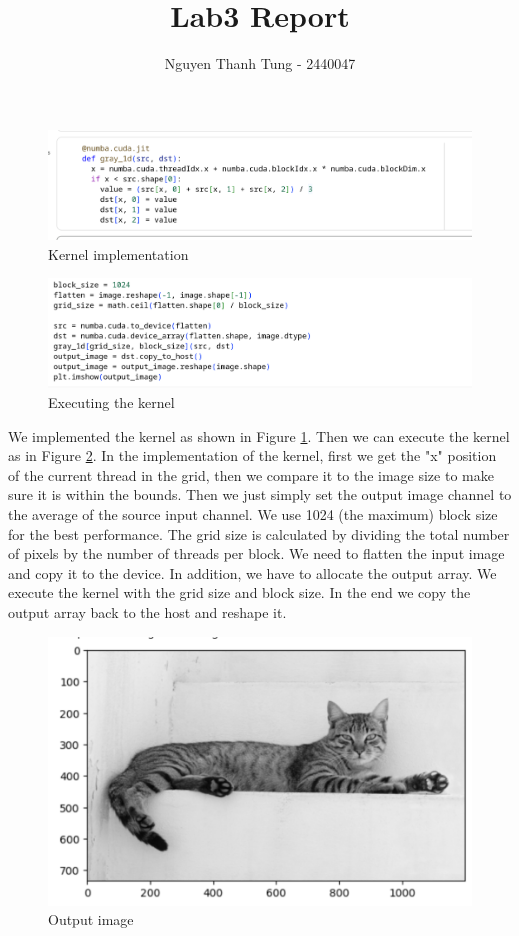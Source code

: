\documentclass{article}
\title{Lab3 Report}
\author{Nguyen Thanh Tung - 2440047}
\begin{document}
\maketitle


\begin{figure}[h!]
    \centering
    \includegraphics[width=1\linewidth]{impl.png}
    \caption{Kernel implementation}
    \label{fig:kernel}
\end{figure}

\begin{figure}[h!]
    \centering
    \includegraphics[width=1\linewidth]{run.png}
    \caption{Executing the kernel}
    \label{fig:exec}
\end{figure}


We implemented the kernel as shown in Figure \ref{fig:kernel}. Then we can execute the kernel as in Figure \ref{fig:exec}. In the implementation of the kernel, first we get the "x" position of the current thread in the grid, then we compare it to the image size to make sure it is within the bounds. Then we just simply set the output image channel to the average of the source input channel. We use 1024 (the maximum) block size for the best performance. The grid size is calculated by dividing the total number of pixels by the number of threads per block. We need to flatten the input image and copy it to the device. In addition, we have to allocate the output array. We execute the kernel with the grid size and block size. In the end we copy the output array back to the host and reshape it.


\begin{figure}[h!]
    \centering
    \includegraphics[width=0.5\linewidth]{output.png}
    \caption{Output image}
    \label{fig:placeholder}
\end{figure}
\end{document}
